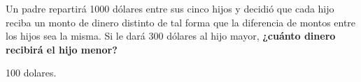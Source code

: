 \question[10] Un padre repartirá 1000 dólares entre sus cinco hijos y decidió que cada hijo reciba un monto de dinero distinto de tal forma que la diferencia de montos entre los hijos sea la misma.
Si le dará 300 dólares al hijo mayor,
\textbf{¿cuánto dinero recibirá el hijo menor?}

\begin{solutionbox}{2cm}
    100 dolares.
\end{solutionbox}